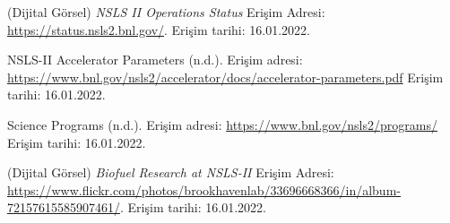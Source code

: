 \documentclass[aspectratio=169,10pt]{beamer}
\begin{document}
\begin{frame}[allowframebreaks]
\begin{thebibliography}{99}
	 (Dijital Görsel) \textit{NSLS II Operations Status} Erişim Adresi: \url{https://status.nsls2.bnl.gov/}. Erişim tarihi: 16.01.2022.
	
	  NSLS-II Accelerator Parameters (n.d.). Erişim adresi: \url{https://www.bnl.gov/nsls2/accelerator/docs/accelerator-parameters.pdf} Erişim tarihi: 16.01.2022.

    Science Programs (n.d.). Erişim adresi: \url{https://www.bnl.gov/nsls2/programs/} Erişim tarihi: 16.01.2022.
   
    (Dijital Görsel) \textit{Biofuel Research at NSLS-II} Erişim Adresi: \url{https://www.flickr.com/photos/brookhavenlab/33696668366/in/album-72157615585907461/}.
   Erişim tarihi: 16.01.2022.
	\end{thebibliography}
	
\end{frame}
\end{document}
